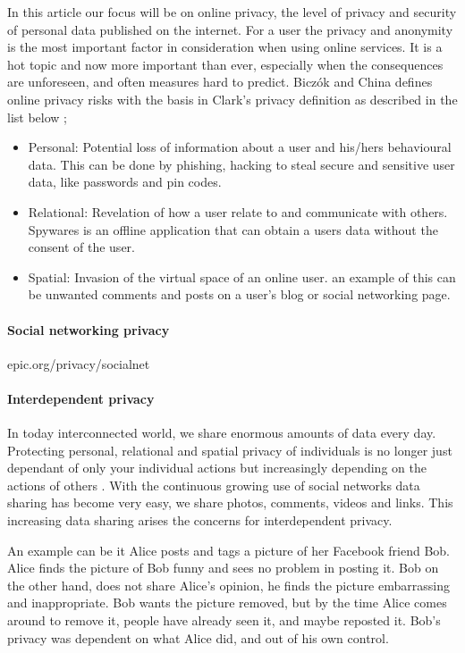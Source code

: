 In this article our focus will be on online privacy, the level of privacy and security of personal data published on the internet. For a user the privacy and anonymity is the most important factor in consideration when using online services. It is a hot topic and now more important than ever, especially when the consequences are unforeseen, and often measures hard to predict. Biczók and China defines online privacy risks with the basis in Clark's privacy definition as described in the list below \cite{InterdependetPriv};

\begin{itemize} 
\item Personal: Potential loss of information about a user and his/hers behavioural data. This can be done by phishing, hacking to steal secure and sensitive user data, like passwords and pin codes.
\item Relational: Revelation of how a user relate to and communicate with others. Spywares is an offline application that can obtain a users data without the consent of the user. 
\item Spatial: Invasion of  the virtual space of an online user. an example of this can be unwanted comments and posts on a user's blog or social networking page.
\end{itemize}

\paragraph{Social networking privacy}
epic.org/privacy/socialnet

\paragraph{Interdependent privacy}
In today interconnected world, we share enormous amounts of data every day.  Protecting personal, relational and spatial privacy of individuals is no longer just dependant of only your individual actions but increasingly depending on the actions of others \cite{InterdependetPriv}. With the continuous growing use of social networks data sharing has become very easy, we share photos, comments, videos and links. This increasing data sharing arises the concerns for interdependent privacy. 
 
An example can be it Alice posts and tags a picture of her Facebook friend Bob. Alice finds the picture of Bob funny and sees no problem in posting it. Bob on the other hand, does not share Alice's opinion, he finds the picture embarrassing and inappropriate. Bob wants the picture removed, but by the time Alice comes around to remove it, people have already seen it, and maybe reposted it. Bob's privacy was dependent on what Alice did, and out of his own control. 
 
